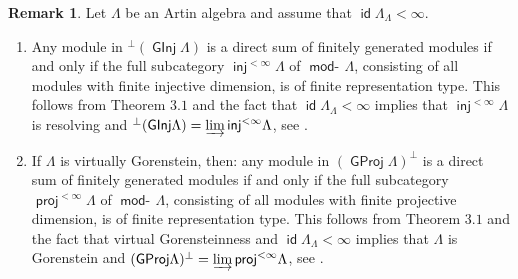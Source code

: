 \documentclass[oneside, a4paper,reqno]{amsart}
\numberwithin{equation}{section}
\theoremstyle{definition}
\newtheorem{rem}[thm]{Remark}
\begin{document}
\begin{rem} Let $\Lambda$ be an Artin algebra and assume that
$\operatorname*{\mathsf{id}}\Lambda_{\Lambda} < \infty$.
\begin{enumerate}
\item Any module in ${^{\bot}}({\operatorname{\mathsf{GInj}}\nolimits}\Lambda)$ is a direct sum of
finitely generated modules if and only if the full subcategory
$\operatorname*{\mathsf{inj}}^{<\infty}\!\Lambda$ of $\operatorname*{\mathsf{mod}-\!}\Lambda$, consisting of all
modules with finite injective dimension, is of finite representation
type. This follows from Theorem $3.1$ and the fact that
$\operatorname*{\mathsf{id}}\Lambda_{\Lambda} < \infty$ implies that
$\operatorname*{\mathsf{inj}}^{<\infty}\!\Lambda$ is resolving and ${^{\bot}}({\operatorname{\mathsf{GInj}}\nolimits}\Lambda)
= \operatorname*{\varinjlim}\operatorname*{\mathsf{inj}}^{<\infty}\!\Lambda$, see \cite[Theorem 11.3]{B:cm}.
\item If $\Lambda$ is virtually Gorenstein, then:
any module in $({\operatorname{\mathsf{GProj}}\nolimits}\Lambda)^{\bot}$ is a direct sum of finitely
generated modules if and only if the full subcategory
$\operatorname*{\mathsf{proj}}^{<\infty}\!\Lambda$ of $\operatorname*{\mathsf{mod}-\!}\Lambda$, consisting of all
modules with finite projective dimension, is of finite
representation type. This follows from Theorem $3.1$ and the fact
that virtual Gorensteinness and $\operatorname*{\mathsf{id}}\Lambda_{\Lambda} < \infty$
implies that $\Lambda$ is Gorenstein and  $({\operatorname{\mathsf{GProj}}\nolimits}\Lambda)^{\bot} =
\operatorname*{\varinjlim}\operatorname*{\mathsf{proj}}^{<\infty}\!\Lambda$, see \cite[Theorem 11.4]{B:cm}.
\end{enumerate}
\end{rem}
\end{document}
